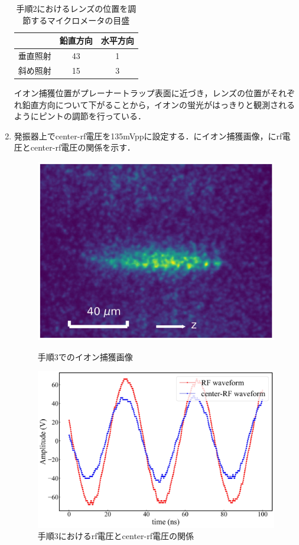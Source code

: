 \begin{enumerate}
\begin{table}[h]
\begin{center}
	\caption{手順2におけるレンズの位置を調節するマイクロメータの目盛}
	\label{tab:2_2D}
	\begin{tabular}{c|cc} \hline \hline
		&鉛直方向&水平方向 \\ \hline
		垂直照射&43 & 1 \\ 
		斜め照射&15 & 3 \\ \hline
	\end{tabular}
\end{center}
\end{table}

イオン捕獲位置がプレーナートラップ表面に近づき，レンズの位置がそれぞれ鉛直方向について下がることから，イオンの蛍光がはっきりと観測されるようにピントの調節を行っている．
\item 発振器上でcenter-rf電圧を135mVppに設定する．にイオン捕獲画像，にrf電圧とcenter-rf電圧の関係を示す．

\begin{figure}[h]
	\begin{minipage}{0.48\linewidth}
	\begin{center}
		\includegraphics[width = 0.6\columnwidth]{./methods/figure/3_2D.jpg}
		\caption{手順3でのイオン捕獲画像}
		\label{fig:3_2D}
	\end{center}
	\end{minipage}
	\begin{minipage}{0.48\linewidth}
		\begin{center}
			\includegraphics[width = 0.9\columnwidth]{./methods/figure/3_2D_wave.jpg}
			\caption{手順3におけるrf電圧とcenter-rf電圧の関係}
			\label{fig:3_2D_wave}
		\end{center}
	\end{minipage}
\end{figure}


\end{enumerate}
